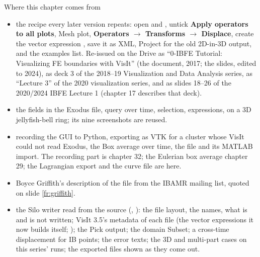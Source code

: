 \documentclass[aspectratio=169,11pt]{beamer}
\newcommand{\gui}[1]{\textsf{\textbf{#1}}}
\begin{document}
\begin{frame}{Where this chapter comes from}
\label{fr:sources}
\scriptsize
\begin{itemize}
  \item {} the recipe every later version repeats: open  and , untick \gui{Apply operators to all plots}, Mesh plot, \gui{Operators $\to$ Transforms $\to$ Displace}, create the vector expression , save it as XML, Project for the old 2D-in-3D output, and the examples list. Re-issued on the Drive as ``0-IBFE Tutorial: Visualizing FE boundaries with VisIt'' (the document, 2017; the slides, edited to 2024), as deck 3 of the 2018--19 Visualization and Data Analysis series, as ``Lecture 3'' of the 2020 visualization series, and as slides 18--26 of the 2020/2024 IBFE Lecture 1 (chapter 17 describes that deck).
  \item {} the fields in the Exodus file, query over time, selection, expressions, on a 3D jellyfish-bell ring; its nine screenshots are reused.
  \item {} recording the GUI to Python, exporting  as VTK for a cluster whose VisIt could not read Exodus, the Box average over time, the  file and its MATLAB import. The recording part is chapter 32; the Eulerian box average chapter 29; the Lagrangian export and the curve file are here.
  \item {} Boyce Griffith's description of the file from the IBAMR mailing list, quoted on slide \ref{fr:griffith}.
  \item {} the Silo writer read from the source (, ): the file layout, the names, what is and is not written; VisIt 3.5's metadata of each file (the vector expressions it now builds itself; ); the Pick output; the domain Subset; a cross-time displacement for IB points; the error texts; the 3D and multi-part cases on this series' runs; the exported files shown as they come out.
\end{itemize}
\end{frame}
\end{document}
